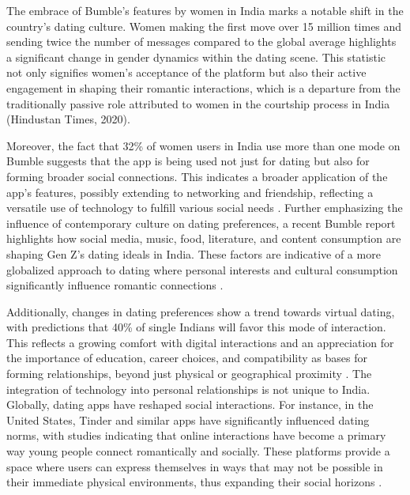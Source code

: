 The embrace of Bumble's features by women in India marks a notable shift in the country's dating culture. Women making the first move over 15 million times and sending twice the number of messages compared to the global average highlights a significant change in gender dynamics within the dating scene. This statistic not only signifies women's acceptance of the platform but also their active engagement in shaping their romantic interactions, which is a departure from the traditionally passive role attributed to women in the courtship process in India (Hindustan Times, 2020).

Moreover, the fact that 32\% of women users in India use more than one mode on Bumble suggests that the app is being used not just for dating but also for forming broader social connections. This indicates a broader application of the app's features, possibly extending to networking and friendship, reflecting a versatile use of technology to fulfill various social needs \cite{HindustanTimes_2020}. Further emphasizing the influence of contemporary culture on dating preferences, a recent Bumble report highlights how social media, music, food, literature, and content consumption are shaping Gen Z's dating ideals in India. These factors are indicative of a more globalized approach to dating where personal interests and cultural consumption significantly influence romantic connections \cite{Chronicle_2023}.

Additionally, changes in dating preferences show a trend towards virtual dating, with predictions that 40\% of single Indians will favor this mode of interaction. This reflects a growing comfort with digital interactions and an appreciation for the importance of education, career choices, and compatibility as bases for forming relationships, beyond just physical or geographical proximity \cite{MediaInfoline_2021}. The integration of technology into personal relationships is not unique to India. Globally, dating apps have reshaped social interactions. For instance, in the United States, Tinder and similar apps have significantly influenced dating norms, with studies indicating that online interactions have become a primary way young people connect romantically and socially. These platforms provide a space where users can express themselves in ways that may not be possible in their immediate physical environments, thus expanding their social horizons \cite{Smith_2016}.

